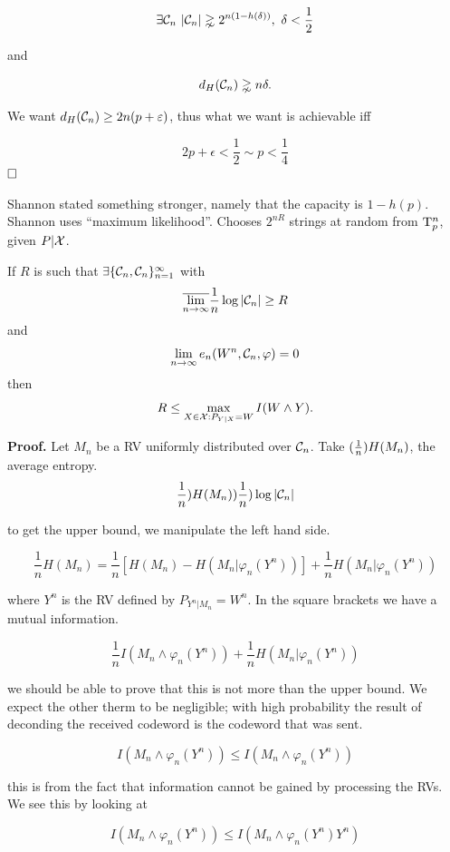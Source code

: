 \[
\exists \mathcal{C}_n\ |\mathcal{C}_n | \gnsim 2^{n(1-h(\delta))},\ \delta < \frac{1}{2}
\]

and

\[
d_H(\mathcal{C}_n) \gnsim n\delta.
\]

We want $d_H(\mathcal{C}_n) \geq 2n(p+\varepsilon)$, thus what we want is achievable iff

\[
2p + \epsilon < \dfrac{1}{2} \sim p < \dfrac{1}{4}
\]
$\hfill\Box$

Shannon stated something stronger, namely that the capacity is $1 - h(p)$. Shannon uses ``maximum likelihood''. Chooses $2^{nR}$ strings at random from $\mathrm{T}^n_p$, given $P|\mathcal{X}$.

\begin{thm}
	If $R$ is such that $\exists \{\mathcal{C}_n, \mathcal{C}_n\}_{n=1}^\infty$ with
	$$\overline{\lim_{n \rightarrow \infty}} \dfrac{1}{n} \log|\mathcal{C}_n| \geq R$$
	and
	$$\lim_{n\rightarrow \infty} e_n(W^n, \mathcal{C}_n, \varphi) = 0$$
	then
	$$R \leq \max_{X \in \mathcal{X}:P_{Y|X} = W} I(W \wedge Y).$$
\end{thm}

\noindent\textbf{Proof.} Let $M_n$ be a RV uniformly distributed over $\mathcal{C}_n$. Take $(\frac{1}{n})H(M_n)$, the average entropy.
\[
 \dfrac{1}{n})H(M_n) ) \dfrac{1}{n})\log|\mathcal{C}_n|
\]

to get the upper bound, we manipulate the left hand side.

\[
 \dfrac{1}{n}H(M_n) = \dfrac{1}{n}[H(M_n) - H(M_n | \varphi_n(Y^n))] + \dfrac{1}{n}H(M_n|\varphi_n(Y^n))
\]

where $Y^n$ is the RV defined by $P_{Y^n|M_n} = W^n$. In the square brackets we have a mutual information.

\[
 \dfrac{1}{n}I(M_n \wedge \varphi_n(Y^n)) + \dfrac{1}{n}H(M_n|\varphi_n(Y^n))
\]

we should be able to prove that this is not more than the upper bound. We expect the other therm to be negligible; with high probability the result of deconding the received codeword is the codeword that was sent.

\[
 I(M_n\wedge \varphi_n(Y^n)) \leq I(M_n \wedge \varphi_n(Y^n))
\]

this is from the fact that information cannot be gained by processing the RVs. We see this by looking at

\begin{equation}\label{eq:dis1}
 I(M_n\wedge \varphi_n(Y^n)) \leq I(M_n \wedge \varphi_n(Y^n)Y^n) 
\end{equation}

